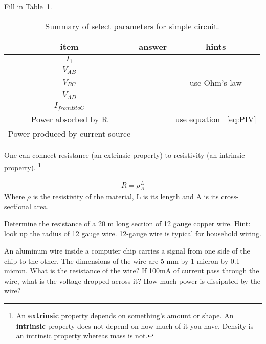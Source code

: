 \begin{blevel}
Fill in Table~\ref{T:21}.
\end{blevel}

\begin{table}[H]
\begin{center}
\begin{tabular}{|c|c|c|}\hline
item&answer&hints\\ \hline
$I_1$	&	&	\\ \hline
$V_{AB}$	&	&	\\ \hline
$V_{BC}$	&	& use Ohm's law	\\ \hline
$V_{AD}$	&	&	\\ \hline
$I_{from B to C}$	&	&	\\ \hline
Power absorbed by R	&	& use equation ~\eqref{eq:PIV}	\\ \hline
Power produced by current source	&	&	\\ \hline
\end{tabular}
\label{T:21}
\caption{Summary of select parameters for simple circuit.}
\end{center}
\end{table}

One can connect resistance (an extrinsic property) to resistivity (an intrinsic property). \footnote{An \textbf{extrinsic} property depends on something's amount or shape. An \textbf{intrinsic} property does not depend on how much of it you have. Density is an intrinsic property whereas mass is not.}\par

\begin{align}
R = \rho \frac{L}{A} \label{eq:2rho}
\end{align}
Where $\rho$ is the resistivity of the material, L is its length and A is its cross-sectional area.

\begin{blevel}
Determine the resistance of a 20 m long section of 12 gauge copper wire. Hint: look up the radius of 12 gauge wire. 12-gauge wire is typical for household wiring.
\end{blevel}

\begin{blevel}
An aluminum wire inside a computer chip carries a signal from one side of the chip to the other. The dimensions of the wire are 5 mm by 1 micron by 0.1 micron. What is the resistance of the wire? If 100mA of current pass through the wire, what is the voltage dropped across it? How much power is dissipated by the wire? 
\end{blevel}

